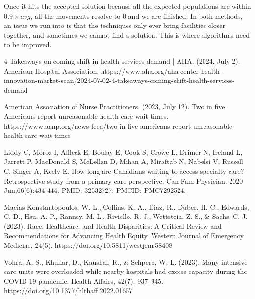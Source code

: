 \documentclass{article}
\begin{document}
Once it hits the accepted solution because all the expected populations are within $0.9 \times avg$, all the movements resolve to $0$ and we are finished. In both methods, an issue we run into is that the techniques only ever bring facilities closer together, and sometimes we cannot find a solution. This is where algorithms need to be improved.


\begin{thebibliography}{9}
4 Takeaways on coming shift in health services demand | AHA. (2024, July 2). American Hospital Association. https://www.aha.org/aha-center-health-innovation-market-scan/2024-07-02-4-takeaways-coming-shift-health-services-demand

American Association of Nurse Practitioners. (2023, July 12). Two in five Americans report unreasonable health care wait times. https://www.aanp.org/news-feed/two-in-five-americans-report-unreasonable-health-care-wait-times

Liddy C, Moroz I, Affleck E, Boulay E, Cook S, Crowe L, Drimer N, Ireland L, Jarrett P, MacDonald S, McLellan D, Mihan A, Miraftab N, Nabelsi V, Russell C, Singer A, Keely E. How long are Canadians waiting to access specialty care? Retrospective study from a primary care perspective. Can Fam Physician. 2020 Jun;66(6):434-444. PMID: 32532727; PMCID: PMC7292524.

Macias-Konstantopoulos, W. L., Collins, K. A., Diaz, R., Duber, H. C., Edwards, C. D., Hsu, A. P., Ranney, M. L., Riviello, R. J., Wettstein, Z. S., \& Sachs, C. J. (2023). Race, Healthcare, and Health Disparities: A Critical Review and Recommendations for Advancing Health Equity. Western Journal of Emergency Medicine, 24(5). https://doi.org/10.5811/westjem.58408

Vohra, A. S., Khullar, D., Kaushal, R., & Schpero, W. L. (2023). Many intensive care units were overloaded while nearby hospitals had excess capacity during the COVID-19 pandemic. Health Affairs, 42(7), 937–945. https://doi.org/10.1377/hlthaff.2022.01657
\end{thebibliography}
\end{document}
